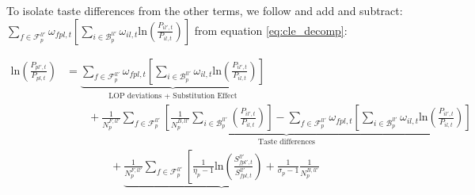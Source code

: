 To isolate taste differences from the other terms, we follow \citet{Redding2020} and add and subtract: $\sum_{f \in \mathcal{F}^{ll'}_{p}} 
\omega_{fpl,t}
\left[
    \sum_{i \in \mathcal{B}^{ll'}_{p}} 
    \omega_{il,t}
    \text{ln}
    \left(
        \frac{P_{il',t}}{P_{il,t}}
    \right)
\right]$ from equation \ref{eq:cle_decomp}: 
\begin{linenomath*}
    \begin{equation}\label{eq:cle_decomp2}
        \begin{aligned}
        \text{ln}\left(\frac{P_{pl',t}}{P_{pl,t}}\right)
            &=  \underbrace{
                \sum_{f \in \mathcal{F}^{ll'}_{p}} 
                    \omega_{fpl,t}
                    \left[
                        \sum_{i \in \mathcal{B}^{ll'}_{p}} 
                        \omega_{il,t}
                        \text{ln}
                        \left(
                            \frac{P_{il',t}}{P_{il,t}}
                        \right)
                    \right]
                }_{\text{LOP deviations + Substitution Effect}} \\
                & \qquad + 
                \underbrace{
                    \frac{1}{N^{F,ll'}_{p}}
                    \sum_{f \in \mathcal{F}^{ll'}_{p}} 
                        \left[
                            \frac{1}{N^{B,ll'}_{p}}
                            \sum_{i \in \mathcal{B}^{ll'}_{p}} 
                            \left(
                                \frac{P_{il',t}}{P_{il,t}}
                            \right)
                        \right]
                    -
                    \sum_{f \in \mathcal{F}^{ll'}_{p}} 
                    \omega_{fpl,t}
                    \left[
                        \sum_{i \in \mathcal{B}^{ll'}_{p}} 
                        \omega_{il,t}
                        \text{ln}
                        \left(
                            \frac{P_{il',t}}{P_{il,t}}
                        \right)
                    \right]
                }_{\text{Taste differences}} \\
                & \qquad \qquad + 
                \underbrace{
                    \frac{1}{N^{F,ll'}_{p}}
                    \sum_{f \in \mathcal{F}^{ll'}_{p}} 
                    \left[
                        \frac{1}{\eta_p-1}
                        \text{ln}
                        \left(
                            \frac{S^{ll'}_{fpl',t}}{S^{ll'}_{fpl,t}}
                        \right)
                        +
                        \frac{1}{\sigma_p-1}
                        \frac{1}{N^{B,ll'}_{p}}
}
\end{aligned}
\end{equation}
\end{linenomath*}
